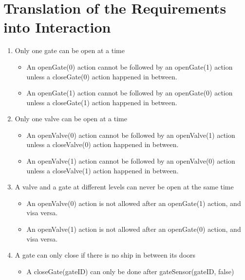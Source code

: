 \section{Translation of the Requirements into Interaction}
\begin{enumerate}
	\item Only one gate can be open at a time	
	\begin{itemize}
		\item An openGate(0) action cannot be followed by an openGate(1) action unless a closeGate(0) action happened in between.
		\item An openGate(1) action cannot be followed by an openGate(0) action unless a closeGate(1) action happened in between.
		
	\end{itemize}
	
	\item Only one valve can be open at a time	
	\begin{itemize}
		\item An openValve(0) action cannot be followed by an openValve(1) action unless a closeValve(0) action happened in between.
		\item An openValve(1) action cannot be followed by an openValve(0) action unless a closeValve(1) action happened in between.
	\end{itemize}
	
	\item A valve and a gate at different levels can never be open at the same time
	\begin{itemize}
		\item An openValve(0) action is not allowed after an openGate(1) action, and visa versa.
		\item An openValve(1) action is not allowed after an openGate(0) action, and visa versa.
	\end{itemize}
	
	\item A gate can only close if there is no ship in between its doors
	\begin{itemize}
		\item A closeGate(gateID) can only be done after gateSensor(gateID, false)
	\end{itemize}
	

\end{enumerate}
